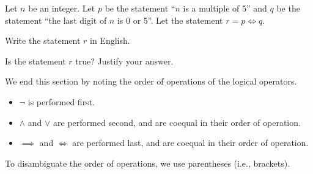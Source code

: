 \begin{exercise}
    Let $n$ be an integer. Let $p$ be the statement ``$n$ is a multiple of 5'' and $q$ be the statement ``the last digit of $n$ is 0 or 5''. Let the statement $r = p \iff q$.
    \begin{partquestions}{\roman*}
        \item Write the statement $r$ in English.
        \item Is the statement $r$ true? Justify your answer.
    \end{partquestions}
\end{exercise}

We end this section by noting the order of operations of the logical operators.
\begin{itemize}
    \item $\lnot$ is performed first.
    \item $\land$ and $\lor$ are performed second, and are coequal in their order of operation.
    \item $\implies$ and $\iff$ are performed last, and are coequal in their order of operation.
\end{itemize}
To disambiguate the order of operations, we use parentheses (i.e., brackets).

